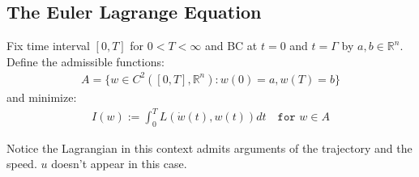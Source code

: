 \subsection{The Euler Lagrange Equation}
\begin{definition}
	Fix time interval $[0, T]$ for $0 < T < \infty$ and BC at $t = 0$ and $t = \Gamma$ by $a, b \in \mathbb{R}^n$. Define the admissible functions:
	\begin{align*}
		A = \bigg\{ w \in C^2([0, T], \mathbb{R}^n): w(0) = a, w(T) = b \bigg\}
	\end{align*}
	and minimize:
	\begin{align*}
		I(w):= \int_0^T L(\dot{w}(t), w(t)) dt \quad \texttt{for } w \in A
	\end{align*}
\end{definition}

Notice the Lagrangian in this context admits arguments of the trajectory and the speed. $u$ doesn't appear in this case. 

